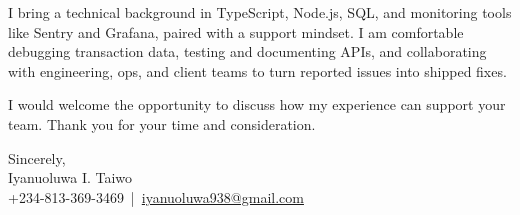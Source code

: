 \documentclass[a4paper, 12pt]{article}
\begin{document}
	I bring a technical background in TypeScript, Node.js, SQL, and monitoring
	tools like Sentry and Grafana, paired with a support mindset. I am comfortable
	debugging transaction data, testing and documenting APIs, and collaborating
	with engineering, ops, and client teams to turn reported issues into shipped
	fixes.

	I would welcome the opportunity to discuss how my experience can support your
	team. Thank you for your time and consideration.

	\vspace{10pt}

	\noindent
	Sincerely,\\ Iyanuoluwa I. Taiwo\\ +234-813-369-3469 \,|\, \href{mailto:iyanuoluwa938@gmail.com}{iyanuoluwa938@gmail.com}
\end{document}
